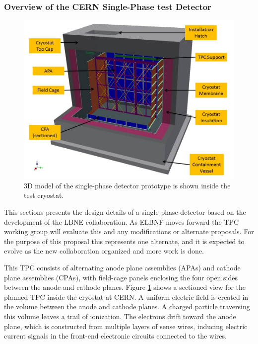 \subsubsection{Overview of the CERN Single-Phase test Detector}
\begin{figure}[htb]
\centering
\begin{minipage}[b]{1.0\textwidth}
\begin{center}
\includegraphics[width=.75\textwidth]{./figures/TPC-3D-section.jpg}
\end{center}
\end{minipage}
\caption{\small 3D model of the single-phase detector prototype is shown inside the test cryostat.}
\label{fig:CERNdet-overview}
\end{figure}

This sections presents the design details of a single-phase detector based on the development of the LBNE collaboration. As ELBNF moves forward the TPC working group will evaluate this and any modifications or alternate proposals. For the purpose of this proposal this represents one alternate, and it is expected to evolve as the new collaboration organized and more work is done. 

This TPC consists of alternating anode plane assemblies (APAs) and cathode plane assemblies (CPAs), with field-cage panels enclosing the four open sides between the anode and cathode planes.  Figure  \ref{fig:CERNdet-overview} shows a sectioned view for the planned TPC inside the cryostat at CERN.  A uniform electric field is created in the volume between the anode and cathode planes. A charged particle traversing this volume leaves a trail of ionization. The electrons drift toward the anode plane, which is constructed from multiple layers of sense wires, inducing electric current signals in the front-end electronic circuits connected to the wires.

